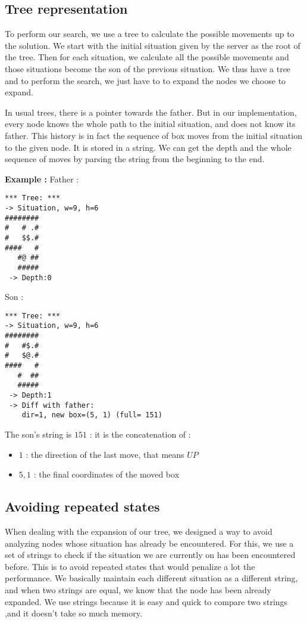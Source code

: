 \documentclass[journal]{IEEEtran}
\begin{document}
\subsection{Tree representation}
\label{tree_rep}
To perform our search, we use a tree to calculate the possible movements up to the solution. We start with the initial situation given by the server as the root of the tree. Then for each situation, we calculate all the possible movements and those situations become the son of the previous situation. We thus have a tree and to perform the search, we just have to to expand the nodes we choose to expand.

In usual trees, there is a pointer towards the father.
But in our implementation, every node knows the whole path to the initial situation, and does not know its father.
This history is in fact the sequence of box moves from the initial situation to the given node.
It is stored in a string.
We can get the depth and the whole sequence of moves by parsing the string from the beginning to the end.

\textbf{Example :}
Father :
\begin{verbatim}
*** Tree: ***
-> Situation, w=9, h=6
########
#   # .#
#   $$.#
####   #
   #@ ##
   #####
 -> Depth:0
\end{verbatim}

Son :
\begin{verbatim}
*** Tree: ***
-> Situation, w=9, h=6
########
#   #$.#
#   $@.#
####   #
   #  ##
   #####
 -> Depth:1
 -> Diff with father:
    dir=1, new box=(5, 1) (full= 151)
\end{verbatim}

The son's string is $151$ : it is the concatenation of :
\begin{itemize}
    \item $1$ : the direction of the last move, that means $UP$
    \item $5, 1$ : the final coordinates of the moved box
\end{itemize}

\subsection{Avoiding repeated states}
When dealing with the expansion of our tree, we designed a way to avoid analyzing nodes whose situation has already be encountered. For this, we use a set of strings to check if the situation we are currently on has been encountered before. This is to avoid repeated states that would penalize a lot the performance. We basically maintain each different situation as a different string, and when two strings are equal, we know that the node has been already expanded. We use strings because it is easy and quick to compare two strings ,and it doesn't take so much memory.
\end{document}
